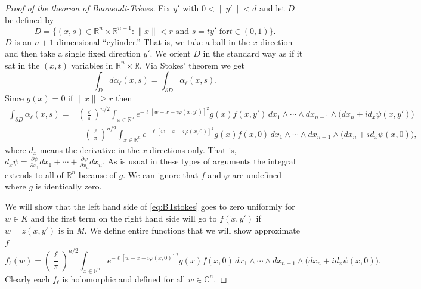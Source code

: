 \documentclass[12pt,openany]{book}
\newcommand{\snorm}[1]{\lVert {#1} \rVert}
\newcommand{\C}{{\mathbb{C}}}
\newcommand{\R}{{\mathbb{R}}}
\theoremstyle{plain}
\theoremstyle{remark}
\theoremstyle{definition}
\theoremstyle{exercise}
\theoremstyle{example}
\begin{document}
\begin{proof}[Proof of the theorem of Baouendi-Tr{\`e}ves]
%
Fix $y'$ with $0 < \snorm{y'} < d$ and let $D$ be defined by
\begin{equation*}
D = \{ (x,s) \in \R^n \times \R^{n-1} : \snorm{x} < r \text{ and } s = t y' \text{ for
$t \in (0,1)$} \} .
\end{equation*}
$D$ is an $n+1$ dimensional ``cylinder.''  That is, we take a ball in the
$x$ direction and then take a single fixed direction $y'$.  We orient $D$ in
the standard way as if it sat in the $(x,t)$ variables in $\R^n \times \R$.
Via Stokes' theorem we get
\begin{equation*}
\int_D d \alpha_{\ell} (x,s)
=
\int_{\partial D} \alpha_{\ell} (x,s) .
\end{equation*}
Since $g(x) = 0$ if $\snorm{x} \geq r$ then
\begin{equation} \label{eq:BTstokes}
\begin{split}
\int_{\partial D} \alpha_{\ell}(x,s)
=
&
{\left(\frac{\ell}{\pi}\right)}^{n/2}
\int_{x\in\R^n}
e^{-\ell [w - x-i\varphi(x,y')]^2 } g(x) f(x,y')
\,
dx_1  \wedge
\cdots \wedge
dx_{n-1}
\wedge
\bigl(dx_{n} + i d_x \psi (x,y') \bigr) 
\\
& 
-
{\left(\frac{\ell}{\pi}\right)}^{n/2}
\int_{x \in \R^n}
e^{  -\ell [w - x-i\varphi(x,0)]^2 } g(x) f(x,0)
\,
dx_1  \wedge
\cdots \wedge
dx_{n-1}
\wedge
\bigl(dx_{n} + i d_x \psi (x,0) \bigr) ,
\end{split}
\end{equation}
where $d_x$ means the derivative in the $x$ directions only.
That is, $d_x \psi =
\frac{\partial \psi}{\partial x_1} dx_1
+ \cdots +
\frac{\partial \psi}{\partial x_n} dx_n$.
As is usual in these types of arguments the integral extends to all of
$\R^n$ because of $g$.  We can ignore that $f$ and $\varphi$ are undefined
where $g$ is identically zero.

We will show that the left hand side of \eqref{eq:BTstokes} goes to zero uniformly for $w \in K$
and the first term on the right hand side will go to $f(\tilde{x},y')$
if $w = z(\tilde{x},y')$ is in $M$.  We
define entire functions that we will show approximate $f$
\begin{equation*}
f_\ell(w)
=
{\left(\frac{\ell}{\pi}\right)}^{n/2}
\int_{x \in \R^n}
e^{  -\ell [w - x-i\varphi(x,0)]^2 } g(x) f(x,0)
\,
dx_1  \wedge
\cdots \wedge
dx_{n-1}
\wedge
\bigl(dx_{n} + i d_x \psi (x,0) \bigr) .
\end{equation*}
Clearly each $f_\ell$ is holomorphic and defined for all $w \in \C^n$.


\end{proof}
\end{document}
